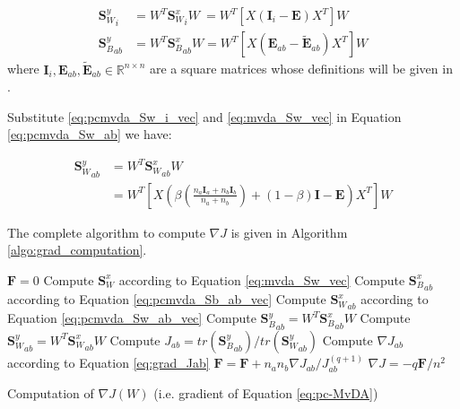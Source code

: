         \begin{align}
            {\boldsymbol{S}_W^y}_{i}  &= W^T {\boldsymbol{S}_W^x}_{i} W \ = W^T\left[X\left(\boldsymbol{I}_{i} - \boldsymbol{E}\right)X^T\right]W \label{eq:pcmvda_Sw_i_vec} \\
            {\boldsymbol{S}_B^y}_{ab} &= W^T {\boldsymbol{S}_B^x}_{ab} W = W^T\left[X\left(\boldsymbol{E}_{ab} - \boldsymbol{\tilde{E}}_{ab}\right)X^T\right]W \label{eq:pcmvda_Sb_ab_vec}
        \end{align}
        where $\boldsymbol{I}_{i}, \boldsymbol{E}_{ab}, \boldsymbol{\tilde{E}}_{ab} \in \mathbb{R}^{n\times n}$ are a square matrices whose definitions will be given in .

        Substitute \eqref{eq:pcmvda_Sw_i_vec} and \eqref{eq:mvda_Sw_vec} in Equation \eqref{eq:pcmvda_Sw_ab} we have:

        \begin{equation}
            \begin{split}
                {\boldsymbol{S}_W^y}_{ab} &= W^T{\boldsymbol{S}_W^x}_{ab}W \\
                &= W^T\left[X\left(\beta\left(\frac{n_a\boldsymbol{I}_a+n_b\boldsymbol{I}_b}{n_a+n_b}\right) + \left(1-\beta\right)\boldsymbol{I} - \boldsymbol{E}\right)X^T\right]W
            \end{split}
            \label{eq:pcmvda_Sw_ab_vec}
        \end{equation}

        The complete algorithm to compute $\nabla J$ is given in Algorithm \ref{algo:grad_computation}.

        \begin{algorithm}
            \SetEndCharOfAlgoLine{\relax}
            $\boldsymbol{F} = 0$\;
            Compute $\boldsymbol{S}_W^x$ according to Equation \eqref{eq:mvda_Sw_vec}\;
             {
                 {
                    Compute ${\boldsymbol{S}_B^x}_{ab}$ according to Equation \eqref{eq:pcmvda_Sb_ab_vec}\;
                    Compute ${\boldsymbol{S}_W^x}_{ab}$ according to Equation \eqref{eq:pcmvda_Sw_ab_vec}\;
                    Compute ${\boldsymbol{S}_B^y}_{ab}=W^T{\boldsymbol{S}_B^x}_{ab}W$\;
                    Compute ${\boldsymbol{S}_W^y}_{ab}=W^T{\boldsymbol{S}_W^x}_{ab}W$\;
                    Compute $J_{ab}=tr\left({\boldsymbol{S}_B^y}_{ab}\right)/tr\left({\boldsymbol{S}_W^y}_{ab}\right)$\;
                    Compute $\nabla J_{ab}$ according to Equation \eqref{eq:grad_Jab}\;
                    $\boldsymbol{F} = \boldsymbol{F} + n_an_b\nabla J_{ab}/J_{ab}^{(q+1)}$\;
                }
            }
            $\nabla J = {-q\boldsymbol{F}}/{n^2}$\;
            \caption{Computation of $\nabla J\left(W\right)$ (i.e. gradient of Equation \eqref{eq:pc-MvDA})}
            \label{algo:grad_computation}
        \end{algorithm}

